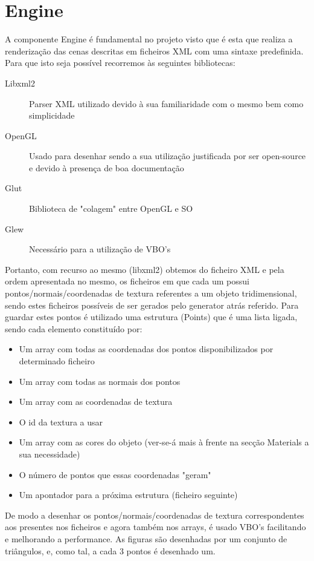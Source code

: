 \documentclass{article}
\begin{document}
\section{Engine}
A componente Engine é fundamental no projeto visto que é esta que realiza a renderização das cenas descritas em ficheiros XML com uma sintaxe predefinida.
Para que isto seja possível recorremos às seguintes bibliotecas:
\begin{description}
    \item [Libxml2] Parser XML utilizado devido à sua familiaridade com o mesmo bem como simplicidade
    \item [OpenGL] Usado para desenhar sendo a sua utilização justificada por ser open-source e devido à presença de boa documentação
    \item [Glut] Biblioteca de "colagem" entre OpenGL e SO
    \item [Glew] Necessário para a utilização de VBO's
\end{description}
Portanto, com recurso ao mesmo (libxml2) obtemos do ficheiro XML e pela ordem apresentada no mesmo, os ficheiros em que cada um possui pontos/normais/coordenadas de textura referentes a um objeto tridimensional, sendo estes ficheiros possíveis de ser gerados pelo generator atrás referido. 
Para guardar estes pontos é utilizado uma estrutura (Points) que é uma lista ligada, sendo cada elemento constituído por:
\begin{itemize}
    \item Um array com todas as coordenadas dos pontos disponibilizados por determinado ficheiro
    \item Um array com todas as normais dos pontos
    \item Um array com as coordenadas de textura
    \item O id da textura a usar
    \item Um array com as cores do objeto (ver-se-á mais à frente na secção Materials a sua necessidade)
    \item O número de pontos que essas coordenadas "geram"
    \item Um apontador para a próxima estrutura (ficheiro seguinte)
\end{itemize}
De modo a desenhar os pontos/normais/coordenadas de textura correspondentes aos presentes nos ficheiros e agora também nos arrays, é usado VBO's facilitando e melhorando a performance. As figuras são desenhadas por um conjunto de triângulos, e, como tal, a cada 3 pontos é desenhado um. 
\end{document}
